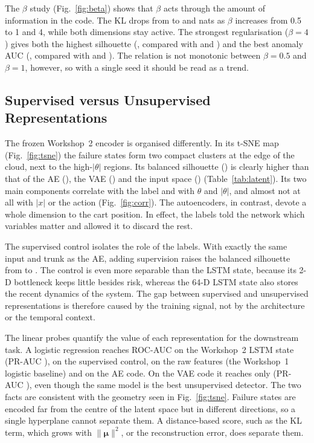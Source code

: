 \documentclass[conference]{IEEEtran}
\begin{document}
The $\beta$ study (Fig.~\ref{fig:beta}) shows that $\beta$ acts through the amount of
information in the code. The KL drops from \klHalf{} to \klOne{} and \klFour{} nats as
$\beta$ increases from 0.5 to 1 and 4, while both dimensions stay active. The strongest
regularisation ($\beta=4$) gives both the highest silhouette (\silbetaFour, compared with
\silbetaHalf{} and \silbetaOne) and the best anomaly AUC (\aucbetaFour, compared with
\aucbetaHalf{} and \aucbetaOne). The relation is not monotonic between $\beta=0.5$ and
$\beta=1$, however, so with a single seed it should be read as a trend.

\subsection{Supervised versus Unsupervised Representations}
The frozen Workshop~2 encoder is organised differently. In its t-SNE map
(Fig.~\ref{fig:tsne}) the failure states form two compact clusters at the edge of the cloud,
next to the high-$|\theta|$ regions. Its balanced silhouette (\silSup) is clearly higher
than that of the AE (\silAE), the VAE (\silVAE) and the input space (\silRaw)
(Table~\ref{tab:latent}). Its two main components correlate with the label and with
$\theta$ and $|\theta|$, and almost not at all with $|x|$ or the action
(Fig.~\ref{fig:corr}). The autoencoders, in contrast, devote a whole dimension to the cart
position. In effect, the labels told the network which variables matter and allowed it to
discard the rest.

The supervised control isolates the role of the labels. With exactly the same input and
trunk as the AE, adding supervision raises the balanced silhouette from \silAE{} to
\silMlp. The control is even more separable than the LSTM state, because its 2-D bottleneck
keeps little besides risk, whereas the 64-D LSTM state also stores the recent dynamics of
the system. The gap between supervised and unsupervised representations is therefore caused
by the training signal, not by the architecture or the temporal context.

The linear probes quantify the value of each representation for the downstream task. A
logistic regression reaches ROC-AUC \probeSup{} on the Workshop~2 LSTM state (PR-AUC
\probePRSup), \probeMlp{} on the supervised control, \probeRaw{} on the raw features (the
Workshop~1 logistic baseline) and \probeAE{} on the AE code. On the VAE
code it reaches only \probeVAE{} (PR-AUC \probePRVAE), even though the same model is the best
unsupervised detector. The two facts are consistent with the geometry seen in
Fig.~\ref{fig:tsne}. Failure states are encoded far from the centre of the latent space but
in different directions, so a single hyperplane cannot separate them. A distance-based score,
such as the KL term, which grows with $\|\bm\mu\|^2$, or the reconstruction error, does
separate them.
\end{document}
